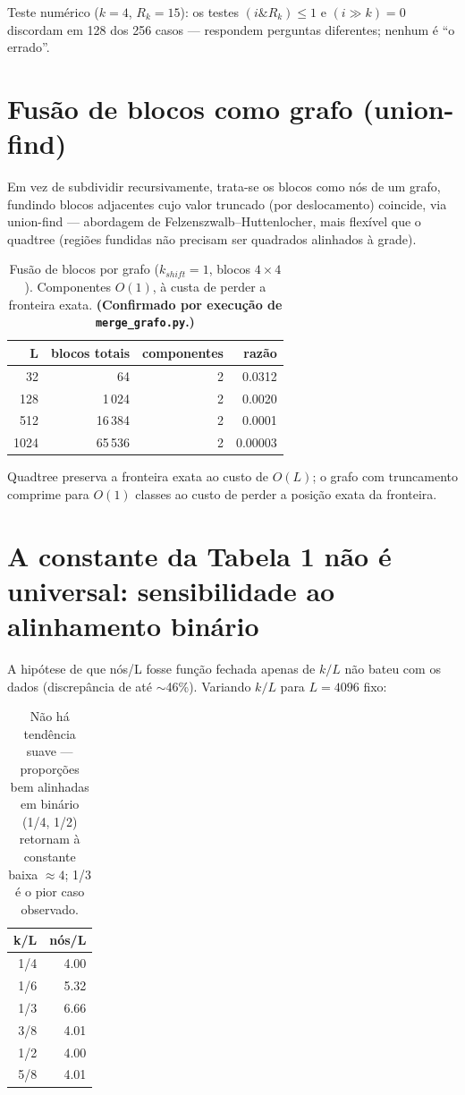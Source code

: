 \documentclass[11pt,a4paper]{article}
\begin{document}
Teste numérico ($k=4$, $R_k=15$): os testes $(i \mathbin{\&} R_k) \le 1$ e $(i \gg k) = 0$ discordam em 128 dos 256 casos --- respondem perguntas diferentes; nenhum é ``o errado''.

\section{Fusão de blocos como grafo (union-find)}

Em vez de subdividir recursivamente, trata-se os blocos como nós de um grafo, fundindo blocos adjacentes cujo valor truncado (por deslocamento) coincide, via union-find --- abordagem de Felzenszwalb--Huttenlocher, mais flexível que o quadtree (regiões fundidas não precisam ser quadrados alinhados à grade).

\begin{table}[h]
\centering
\begin{tabular}{rrrr}
\toprule
L & blocos totais & componentes & razão \\
\midrule
32   & 64      & 2 & 0.0312 \\
128  & 1\,024  & 2 & 0.0020 \\
512  & 16\,384 & 2 & 0.0001 \\
1024 & 65\,536 & 2 & 0.00003 \\
\bottomrule
\end{tabular}
\caption{Fusão de blocos por grafo ($k_{shift}=1$, blocos $4\times4$). Componentes $O(1)$, à custa de perder a fronteira exata. \textbf{(Confirmado por execução de \texttt{merge\_grafo.py}.)}}
\end{table}

Quadtree preserva a fronteira exata ao custo de $O(L)$; o grafo com truncamento comprime para $O(1)$ classes ao custo de perder a posição exata da fronteira.

\section{A constante da Tabela 1 não é universal: sensibilidade ao alinhamento binário}

A hipótese de que nós/L fosse função fechada apenas de $k/L$ não bateu com os dados (discrepância de até $\sim$46\%). Variando $k/L$ para $L=4096$ fixo:

\begin{table}[h]
\centering
\begin{tabular}{rr}
\toprule
k/L & nós/L \\
\midrule
1/4 & 4.00 \\
1/6 & 5.32 \\
1/3 & 6.66 \\
3/8 & 4.01 \\
1/2 & 4.00 \\
5/8 & 4.01 \\
\bottomrule
\end{tabular}
\caption{Não há tendência suave --- proporções bem alinhadas em binário (1/4, 1/2) retornam à constante baixa $\approx 4$; 1/3 é o pior caso observado.}
\end{table}
\end{document}
